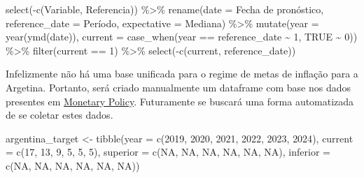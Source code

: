 \documentclass[
]{article}
\newenvironment{Shaded}{\begin{snugshade}}{\end{snugshade}}
\newcommand{\AttributeTok}[1]{\textcolor[rgb]{0.77,0.63,0.00}{#1}}
\newcommand{\ConstantTok}[1]{\textcolor[rgb]{0.00,0.00,0.00}{#1}}
\newcommand{\DecValTok}[1]{\textcolor[rgb]{0.00,0.00,0.81}{#1}}
\newcommand{\FunctionTok}[1]{\textcolor[rgb]{0.00,0.00,0.00}{#1}}
\newcommand{\NormalTok}[1]{#1}
\newcommand{\OtherTok}[1]{\textcolor[rgb]{0.56,0.35,0.01}{#1}}
\newcommand{\SpecialCharTok}[1]{\textcolor[rgb]{0.00,0.00,0.00}{#1}}
\newcommand{\StringTok}[1]{\textcolor[rgb]{0.31,0.60,0.02}{#1}}
\begin{document}
\begin{Shaded}
\begin{Highlighting}[]
  \FunctionTok{select}\NormalTok{(}\SpecialCharTok{{-}}\FunctionTok{c}\NormalTok{(Variable, Referencia)) }\SpecialCharTok{\%\textgreater{}\%} 
  \FunctionTok{rename}\NormalTok{(}\AttributeTok{date =} \StringTok{\textasciigrave{}}\AttributeTok{Fecha de pronóstico}\StringTok{\textasciigrave{}}\NormalTok{,}
         \AttributeTok{reference\_date =}\NormalTok{ Período,}
         \AttributeTok{expectative =}\NormalTok{ Mediana) }\SpecialCharTok{\%\textgreater{}\%} 
  \FunctionTok{mutate}\NormalTok{(}\AttributeTok{year =} \FunctionTok{year}\NormalTok{(}\FunctionTok{ymd}\NormalTok{(date)),}
         \AttributeTok{current =} \FunctionTok{case\_when}\NormalTok{(year }\SpecialCharTok{==}\NormalTok{ reference\_date }\SpecialCharTok{\textasciitilde{}} \DecValTok{1}\NormalTok{, }
                             \ConstantTok{TRUE} \SpecialCharTok{\textasciitilde{}} \DecValTok{0}\NormalTok{)) }\SpecialCharTok{\%\textgreater{}\%}
  \FunctionTok{filter}\NormalTok{(current }\SpecialCharTok{==} \DecValTok{1}\NormalTok{) }\SpecialCharTok{\%\textgreater{}\%} 
  \FunctionTok{select}\NormalTok{(}\SpecialCharTok{{-}}\FunctionTok{c}\NormalTok{(current, reference\_date))}
\end{Highlighting}
\end{Shaded}

Infelizmente não há uma base unificada para o regime de metas de
inflação para a Argetina. Portanto, será criado manualmente um dataframe
com base nos dados presentes em
\href{https://www.bcra.gob.ar/PoliticaMonetaria/Politica_Monetaria_i.asp}{Monetary
Policy}. Futuramente se buscará uma forma automatizada de se coletar
estes dados.

\begin{Shaded}
\begin{Highlighting}[]
\NormalTok{argentina\_target }\OtherTok{\textless{}{-}} \FunctionTok{tibble}\NormalTok{(}\AttributeTok{year =} \FunctionTok{c}\NormalTok{(}\DecValTok{2019}\NormalTok{, }\DecValTok{2020}\NormalTok{, }\DecValTok{2021}\NormalTok{, }\DecValTok{2022}\NormalTok{, }\DecValTok{2023}\NormalTok{, }\DecValTok{2024}\NormalTok{), }
                           \AttributeTok{current =} \FunctionTok{c}\NormalTok{(}\DecValTok{17}\NormalTok{, }\DecValTok{13}\NormalTok{, }\DecValTok{9}\NormalTok{, }\DecValTok{5}\NormalTok{, }\DecValTok{5}\NormalTok{, }\DecValTok{5}\NormalTok{),}
                           \AttributeTok{superior =} \FunctionTok{c}\NormalTok{(}\ConstantTok{NA}\NormalTok{, }\ConstantTok{NA}\NormalTok{, }\ConstantTok{NA}\NormalTok{, }\ConstantTok{NA}\NormalTok{, }\ConstantTok{NA}\NormalTok{, }\ConstantTok{NA}\NormalTok{),}
                           \AttributeTok{inferior =} \FunctionTok{c}\NormalTok{(}\ConstantTok{NA}\NormalTok{, }\ConstantTok{NA}\NormalTok{, }\ConstantTok{NA}\NormalTok{, }\ConstantTok{NA}\NormalTok{, }\ConstantTok{NA}\NormalTok{, }\ConstantTok{NA}\NormalTok{))}
\end{Highlighting}
\end{Shaded}
\end{document}
